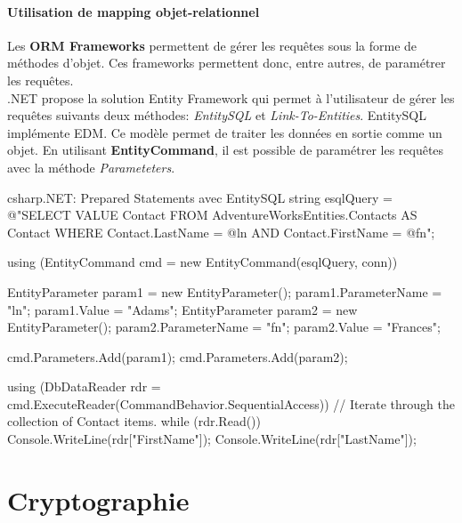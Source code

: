 \documentclass[twoside,a4paper,12pt,titlepage]{book}
\begin{document}

\subsubsection{Utilisation de mapping objet-relationnel}
Les \textbf{\gls{ORM} Frameworks} permettent de gérer les requêtes sous la forme de méthodes d'objet. Ces frameworks permettent donc, entre autres, de paramétrer les requêtes.\\
.NET propose la solution Entity Framework qui permet à l'utilisateur de gérer les requêtes suivants deux méthodes: \textit{EntitySQL} et \textit{Link-To-Entities}.
EntitySQL implémente \gls{EDM}. Ce modèle permet de traiter les données en sortie comme un objet. En utilisant \textbf{EntityCommand}, il est possible de paramétrer les requêtes avec la méthode \textit{Parameteters}.
\begin{Config}{csharp}{.NET: Prepared Statements avec EntitySQL}
    string esqlQuery =
        @"SELECT VALUE Contact FROM AdventureWorksEntities.Contacts 
                    AS Contact WHERE Contact.LastName = @ln AND
                    Contact.FirstName = @fn";

    using (EntityCommand cmd = new EntityCommand(esqlQuery, conn))
    {
        EntityParameter param1 = new EntityParameter();
        param1.ParameterName = "ln";
        param1.Value = "Adams";
        EntityParameter param2 = new EntityParameter();
        param2.ParameterName = "fn";
        param2.Value = "Frances";

        cmd.Parameters.Add(param1);
        cmd.Parameters.Add(param2);

        using (DbDataReader rdr = cmd.ExecuteReader(CommandBehavior.SequentialAccess))
        {
            // Iterate through the collection of Contact items.
            while (rdr.Read())
            {
                Console.WriteLine(rdr["FirstName"]);
                Console.WriteLine(rdr["LastName"]);
            }
        }
    }
\end{Config}	


\appendix
\chapter{Cryptographie}
\end{document}
